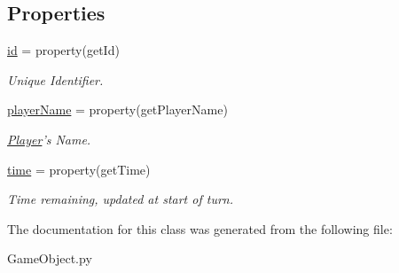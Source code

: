 \subsection*{\-Properties}
\begin{DoxyCompactItemize}
\item 
\hypertarget{classGameObject_1_1Player_a064d564c1e28e928685d44628c6e0339}{\hyperlink{classGameObject_1_1Player_a064d564c1e28e928685d44628c6e0339}{id} = property(get\-Id)}\label{classGameObject_1_1Player_a064d564c1e28e928685d44628c6e0339}

\begin{DoxyCompactList}\small\item\em \-Unique \-Identifier. \end{DoxyCompactList}\item 
\hypertarget{classGameObject_1_1Player_a8b61d81dc440d5f11b5aa96f6b215e7d}{\hyperlink{classGameObject_1_1Player_a8b61d81dc440d5f11b5aa96f6b215e7d}{player\-Name} = property(get\-Player\-Name)}\label{classGameObject_1_1Player_a8b61d81dc440d5f11b5aa96f6b215e7d}

\begin{DoxyCompactList}\small\item\em \hyperlink{classGameObject_1_1Player}{\-Player}'s \-Name. \end{DoxyCompactList}\item 
\hypertarget{classGameObject_1_1Player_afc51771700a7b6c2eb5873284c6dd193}{\hyperlink{classGameObject_1_1Player_afc51771700a7b6c2eb5873284c6dd193}{time} = property(get\-Time)}\label{classGameObject_1_1Player_afc51771700a7b6c2eb5873284c6dd193}

\begin{DoxyCompactList}\small\item\em \-Time remaining, updated at start of turn. \end{DoxyCompactList}\end{DoxyCompactItemize}


\-The documentation for this class was generated from the following file\-:\begin{DoxyCompactItemize}
\item 
\-Game\-Object.\-py\end{DoxyCompactItemize}
